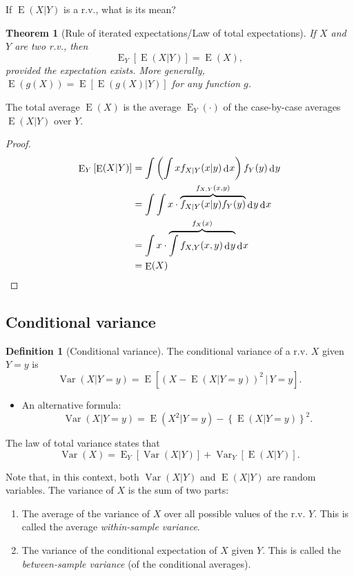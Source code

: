\documentclass[
]{book}
\providecommand{\tightlist}{%
  \setlength{\itemsep}{0pt}\setlength{\parskip}{0pt}}
\DeclareMathOperator{\E}{E}
\DeclareMathOperator{\Var}{Var}
\DeclareMathOperator{\dd}{d}
\newcommand{\dint}{\dd\hspace{0.5pt}\!}
\newtheorem{theorem}{Theorem}[chapter]
\theoremstyle{definition}
\newtheorem{definition}{Definition}[chapter]
\theoremstyle{definition}
\theoremstyle{definition}
\theoremstyle{definition}
\theoremstyle{remark}
\begin{document}
If \(\E(X|Y)\) is a r.v., what is its mean?

\begin{theorem}[Rule of iterated expectations/Law of total expectations]
If \(X\) and \(Y\) are two r.v., then
\[
{\E}_Y\left[\E(X|Y)\right] = \E(X),
\]
provided the expectation exists.
More generally, \(\E(g(X)) = \E\left[\E(g(X)|Y)\right]\) for any function \(g\).
\end{theorem}

The total average \(\E(X)\) is the average \(\E_Y(\cdot)\) of the case-by-case averages \(\E(X|Y)\) over \(Y\).

\begin{proof}
\begin{align*}
{\E}_Y\left[\E(X|Y)\right] 
&= \int \left( \int x f_{X|Y}(x|y)\dint x \right) f_Y(y)\dint y \\
&= \int \int x \cdot \overbrace{f_{X|Y}(x|y) f_Y(y)}^{f_{X,Y}(x,y)}  \dint y \dint x  \\
&= \int  x \cdot \overbrace{\int f_{X,Y}(x,y) \dint y}^{f_X(x)}   \dint x  \\
&= \E(X)
\end{align*}
\end{proof}

\hypertarget{conditional-variance}{%
\subsection{Conditional variance}\label{conditional-variance}}

\begin{definition}[Conditional variance]
The conditional variance of a r.v. \(X\) given \(Y=y\) is
\[
\Var(X|Y=y) = \E \left[ \left(X - \E(X|Y=y)\right)^2 \,\Big|\, Y=y\right].
\]
\end{definition}

\begin{itemize}
\tightlist
\item
  An alternative formula:
  \[
  \Var(X|Y=y) = \E \left(X^2 | Y=y\right) - \left\{ \E(X|Y=y) \right\}^2.
  \]
\end{itemize}

The law of total variance states that
\[
\Var(X) = {\E}_Y\left[\Var(X|Y) \right] + {\Var}_Y\left[\E(X|Y) \right].
\]

Note that, in this context, both \(\Var(X|Y)\) and \(\E(X|Y)\) are random variables.
The variance of \(X\) is the sum of two parts:

\begin{enumerate}
\def\labelenumi{\arabic{enumi}.}
\tightlist
\item
  The average of the variance of \(X\) over all possible values of the r.v. \(Y\). This is called the average \emph{within-sample variance}.
\item
  The variance of the conditional expectation of \(X\) given \(Y\). This is called the \emph{between-sample variance} (of the conditional averages).
\end{enumerate}
\end{document}
